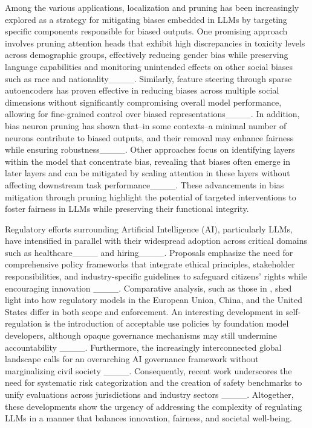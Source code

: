 Among the various applications, localization and pruning has been increasingly explored as a strategy for mitigating biases embedded in LLMs by targeting specific components responsible for biased outputs. One promising approach involves pruning attention heads that exhibit high discrepancies in toxicity levels across demographic groups, effectively reducing gender bias while preserving language capabilities and monitoring unintended effects on other social biases such as race and nationality____. Similarly, feature steering through sparse autoencoders has proven effective in reducing biases across multiple social dimensions without significantly compromising overall model performance, allowing for fine-grained control over biased representations____. In addition, bias neuron pruning has shown that--in some contexts--a minimal number of neurons contribute to biased outputs, and their removal may enhance fairness while ensuring robustness____. Other approaches focus on identifying layers within the model that concentrate bias, revealing that biases often emerge in later layers and can be mitigated by scaling attention in these layers without affecting downstream task performance____. These advancements in bias mitigation through pruning highlight the potential of targeted interventions to foster fairness in LLMs while preserving their functional integrity.

Regulatory efforts surrounding Artificial Intelligence (AI), particularly LLMs, have intensified in parallel with their widespread adoption across critical domains such as healthcare____ and hiring____. Proposals emphasize the need for comprehensive policy frameworks that integrate ethical principles, stakeholder responsibilities, and industry-specific guidelines to safeguard citizens' rights while encouraging innovation ____. Comparative analysis, such as those in \textcite{poncibo2025comparative}, shed light into how regulatory models in the European Union, China, and the United States differ in both scope and enforcement. An interesting development in self-regulation is the introduction of acceptable use policies by foundation model developers, although opaque governance mechanisms may still undermine accountability ____. Furthermore, the increasingly interconnected global landscape calls for an overarching AI governance framework without marginalizing civil society ____. Consequently, recent work underscores the need for systematic risk categorization and the creation of safety benchmarks to unify evaluations across jurisdictions and industry sectors ____. Altogether, these developments show the urgency of addressing the complexity of regulating LLMs in a manner that balances innovation, fairness, and societal well-being.